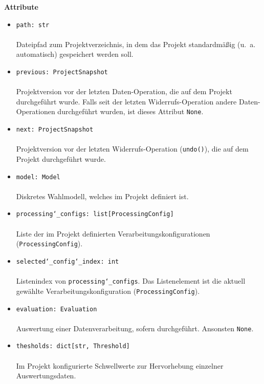 \documentclass{article}
\begin{document}
\textbf{Attribute}
\begin{itemize}\setlength\itemsep{3em}
\item \texttt{path: str}\\\\
Dateipfad zum Projektverzeichnis, in dem das Projekt standardmäßig (u.~a. automatisch) gespeichert werden soll.
\item \texttt{previous: ProjectSnapshot}\\\\
Projektversion vor der letzten Daten-Operation, die auf dem Projekt durchgeführt wurde. Falls seit der letzten Widerrufs-Operation andere Daten-Operationen durchgeführt wurden, ist dieses Attribut \texttt{None}.
\item \texttt{next: ProjectSnapshot}\\\\
Projektversion vor der letzten Widerrufs-Operation (\texttt{undo()}), die auf dem Projekt durchgeführt wurde.
\item \texttt{model: Model}\\\\
Diskretes Wahlmodell, welches im Projekt definiert ist.
\item \texttt{processing\char`_configs: list[ProcessingConfig]}\\\\
Liste der im Projekt definierten Verarbeitungskonfigurationen (\texttt{ProcessingConfig}).
\item \texttt{selected\char`_config\char`_index: int}\\\\
Listenindex von \texttt{processing\char`_configs}. Das Listenelement ist die aktuell gewählte Verarbeitungskonfiguration (\texttt{ProcessingConfig}).
\item \texttt{evaluation: Evaluation}\\\\
Auswertung einer Datenverarbeitung, sofern durchgeführt. Ansonsten \texttt{None}.
\item \texttt{thesholds: dict[str, Threshold]}\\\\
Im Projekt konfigurierte Schwellwerte zur Hervorhebung einzelner Auswertungsdaten.
\\\\
\end{itemize}
\end{document}
